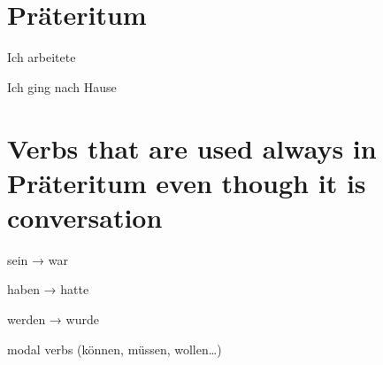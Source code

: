 

\section{Präteritum}



Ich arbeitete

Ich ging nach Hause


\section{Verbs that are used always in Präteritum even though it is conversation}
    sein → war
    
    haben → hatte
    
    werden → wurde
    
    modal verbs (können, müssen, wollen…)